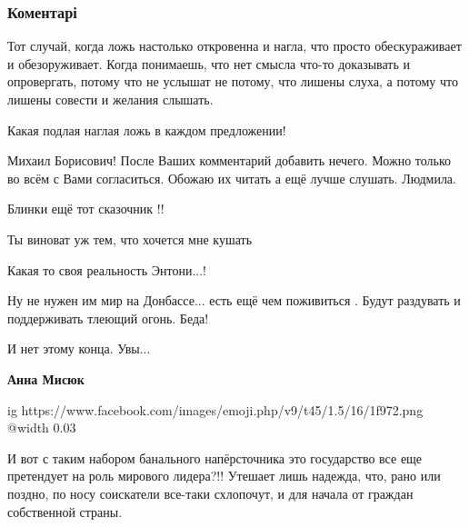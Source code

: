  
 
 
 
 
\subsubsection{Коментарі}
\label{sec:02_12_2021.fb.pogrebinskij_mihail.1.vranje_blinken.cmt}

\begin{itemize} %

Тот случай, когда ложь настолько откровенна и нагла, что просто обескураживает
и обезоруживает. Когда понимаешь, что нет смысла что-то доказывать и
опровергать, потому что не услышат не потому, что лишены слуха, а потому что
лишены совести и желания слышать.


Какая подлая наглая ложь в каждом предложении!


Михаил Борисович! После Ваших комментарий добавить нечего. Можно только во всём
с Вами согласиться. Обожаю их читать а ещё лучше слушать. Людмила.

Блинки ещё тот сказочник !!

Ты виноват уж тем, что хочется мне кушать

Какая то своя реальность Энтони...!

Ну не нужен им мир на Донбассе... есть ещё чем поживиться . Будут раздувать и поддерживать тлеющий огонь. Беда!

\begin{itemize} %
И нет этому конца. Увы...

\textbf{Анна Мисюк}

\ifcmt
  ig https://www.facebook.com/images/emoji.php/v9/t45/1.5/16/1f972.png
  @width 0.03
\fi

\end{itemize} %


И вот с таким набором банального напёрсточника это государство все еще
претендует на роль мирового лидера?!! Утешает лишь надежда, что, рано или
поздно, по носу соискатели все-таки схлопочут, и для начала от граждан
собственной страны.



\end{itemize}
